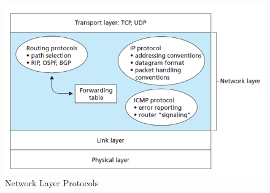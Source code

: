 \documentclass[a4paper]{article}
\theoremstyle{plain}
\theoremstyle{definition}
\begin{document}
\begin{figure}[!t]
    \centering
    \includegraphics[scale=0.6]{cn6.png}
    \caption{Network Layer Protocols}
    \label{fig:my_label_5}
\end{figure}
\end{document}
